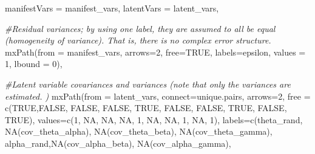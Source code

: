 \documentclass[
12pt, %
twoside,
english]{guelphthesis}
\newenvironment{Shaded}{\begin{snugshade}}{\end{snugshade}}
\newcommand{\AttributeTok}[1]{\textcolor[rgb]{0.77,0.63,0.00}{#1}}
\newcommand{\CommentTok}[1]{\textcolor[rgb]{0.56,0.35,0.01}{\textit{#1}}}
\newcommand{\ConstantTok}[1]{\textcolor[rgb]{0.00,0.00,0.00}{#1}}
\newcommand{\DecValTok}[1]{\textcolor[rgb]{0.00,0.00,0.81}{#1}}
\newcommand{\FunctionTok}[1]{\textcolor[rgb]{0.00,0.00,0.00}{#1}}
\newcommand{\NormalTok}[1]{#1}
\newcommand{\StringTok}[1]{\textcolor[rgb]{0.31,0.60,0.02}{#1}}
\begin{document}
\begin{Shaded}
\begin{Highlighting}[numbers=left,,]
  \AttributeTok{manifestVars =}\NormalTok{ manifest\_vars,}
  \AttributeTok{latentVars =}\NormalTok{ latent\_vars,}
  
  \CommentTok{\#Residual variances; by using one label, they are assumed to all be equal (homogeneity of variance). That is, there is no complex error structure. }
  \FunctionTok{mxPath}\NormalTok{(}\AttributeTok{from =}\NormalTok{ manifest\_vars,}
         \AttributeTok{arrows=}\DecValTok{2}\NormalTok{, }\AttributeTok{free=}\ConstantTok{TRUE}\NormalTok{,  }\AttributeTok{labels=}\StringTok{\textquotesingle{}epsilon\textquotesingle{}}\NormalTok{, }\AttributeTok{values =} \DecValTok{1}\NormalTok{, }\AttributeTok{lbound =} \DecValTok{0}\NormalTok{),}
  
  \CommentTok{\#Latent variable covariances and variances (note that only the variances are estimated. )}
  \FunctionTok{mxPath}\NormalTok{(}\AttributeTok{from =}\NormalTok{ latent\_vars,}
         \AttributeTok{connect=}\StringTok{\textquotesingle{}unique.pairs\textquotesingle{}}\NormalTok{, }\AttributeTok{arrows=}\DecValTok{2}\NormalTok{,}
         \AttributeTok{free =} \FunctionTok{c}\NormalTok{(}\ConstantTok{TRUE}\NormalTok{,}\ConstantTok{FALSE}\NormalTok{, }\ConstantTok{FALSE}\NormalTok{, }\ConstantTok{FALSE}\NormalTok{, }
                  \ConstantTok{TRUE}\NormalTok{, }\ConstantTok{FALSE}\NormalTok{, }\ConstantTok{FALSE}\NormalTok{, }
                  \ConstantTok{TRUE}\NormalTok{, }\ConstantTok{FALSE}\NormalTok{, }
                  \ConstantTok{TRUE}\NormalTok{), }
         \AttributeTok{values=}\FunctionTok{c}\NormalTok{(}\DecValTok{1}\NormalTok{, }\ConstantTok{NA}\NormalTok{, }\ConstantTok{NA}\NormalTok{, }\ConstantTok{NA}\NormalTok{, }
                  \DecValTok{1}\NormalTok{, }\ConstantTok{NA}\NormalTok{, }\ConstantTok{NA}\NormalTok{, }
                  \DecValTok{1}\NormalTok{, }\ConstantTok{NA}\NormalTok{,}
                  \DecValTok{1}\NormalTok{),}
         \AttributeTok{labels=}\FunctionTok{c}\NormalTok{(}\StringTok{\textquotesingle{}theta\_rand\textquotesingle{}}\NormalTok{, }\StringTok{\textquotesingle{}NA(cov\_theta\_alpha)\textquotesingle{}}\NormalTok{, }\StringTok{\textquotesingle{}NA(cov\_theta\_beta)\textquotesingle{}}\NormalTok{, }
                  \StringTok{\textquotesingle{}NA(cov\_theta\_gamma)\textquotesingle{}}\NormalTok{,}
                  \StringTok{\textquotesingle{}alpha\_rand\textquotesingle{}}\NormalTok{,}\StringTok{\textquotesingle{}NA(cov\_alpha\_beta)\textquotesingle{}}\NormalTok{, }\StringTok{\textquotesingle{}NA(cov\_alpha\_gamma)\textquotesingle{}}\NormalTok{, }

\end{Highlighting}
\end{Shaded}
\end{document}
